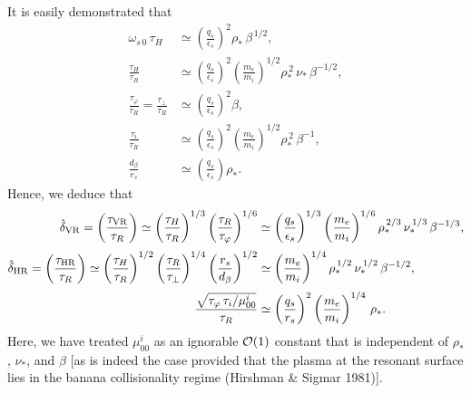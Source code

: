 \documentclass[notitlepage,12pt]{article}
\begin{document}
It is easily demonstrated that
\begin{align}
\omega_{s\,0}\,\tau_H&\simeq \left(\frac{q_s}{\epsilon_s}\right)^2\rho_\ast\,\beta^{\,1/2},\\[0.5ex]
\frac{\tau_H}{\tau_R}&\simeq \left(\frac{q_s}{\epsilon_s}\right)^2\left(\frac{m_e}{m_i}\right)^{1/2}\rho_\ast^{\,2}\,\nu_\ast\,\beta^{-1/2},\\[0.5ex]
\frac{\tau_\varphi}{\tau_R} = \frac{\tau_\perp}{\tau_R} &\simeq \left(\frac{q_s}{\epsilon_s}\right)^2\beta,\\[0.5ex]
\frac{\tau_i}{\tau_R} &\simeq  \left(\frac{q_s}{\epsilon_s}\right)^2\left(\frac{m_e}{m_i}\right)^{1/2}\rho_\ast^{\,2}\,\beta^{-1},\\[0.5ex]
\frac{d_\beta}{r_s} &\simeq \left(\frac{q_s}{\epsilon_s}\right)\rho_\ast.
\end{align} 
Hence, we deduce that 
\begin{align}
\hat{\delta}_{\rm VR} = \left(\frac{\tau_{\rm VR}}{\tau_R}\right) \simeq\left(\frac{\tau_H}{\tau_R}\right)^{1/3}\left(\frac{\tau_R}{\tau_\varphi}\right)^{1/6}&\simeq \left(\frac{q_s}{\epsilon_s}\right)^{1/3}\left(\frac{m_e}{m_i}\right)^{1/6}\rho_\ast^{\,2/3}\,\nu_\ast^{\,1/3}\,\beta^{-1/3},\\[0.5ex]
\hat{\delta}_{\rm HR} = \left(\frac{\tau_{\rm HR}}{\tau_R}\right) \simeq \left(\frac{\tau_H}{\tau_R}\right)^{1/2}\left(\frac{\tau_R}{\tau_\perp}\right)^{1/4}\left(\frac{r_s}{d_\beta}\right)^{1/2}&\simeq \left(\frac{m_e}{m_i}\right)^{1/4}\rho_\ast^{\,1/2}\,\nu_\ast^{\,1/2}\,\beta^{-1/2},\\[0.5ex]
\frac{\sqrt{\tau_\varphi\, \tau_i/\mu_{00}^i}}{\tau_R}&\simeq \left(\frac{q_s}{r_s}\right)^2\left(\frac{m_e}{m_i}\right)^{1/4}\,\rho_\ast.
\end{align}
Here, we have treated $\mu_{00}^i$ as an ignorable ${\cal O}(1)$ constant that is independent of $\rho_\ast$, $\nu_\ast$, and
$\beta$ [as is indeed the case provided that the plasma at the resonant surface lies in the banana collisionality regime (Hirshman \& Sigmar 1981)]. 
\end{document}
